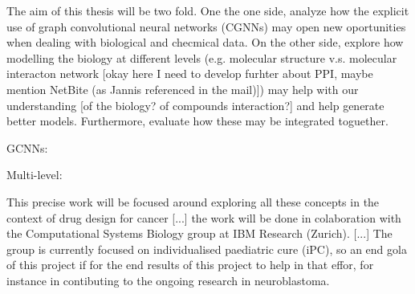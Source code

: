 \documentclass{article}
\begin{document}
The aim of this thesis will be two fold. One the one side, analyze how the explicit use
of graph convolutional neural networks (CGNNs) may open new oportunities when dealing
with biological and checmical data. On the other side, explore how modelling the biology
at different levels (e.g. molecular structure v.s. molecular interacton network [okay
here I need to develop furhter about PPI, maybe mention NetBite (as Jannis referenced in
the mail)]) may help with our understanding [of the biology? of compounds interaction?]
and help generate better models. Furthermore, evaluate how these may be integrated
toguether.

GCNNs: 

Multi-level:

This precise work will be focused around exploring all these concepts in the context of
drug design for cancer [...] the work will be done in colaboration with the
Computational Systems Biology group at IBM Research (Zurich). [...] The group is
currently focused on individualised paediatric cure (iPC), so an end gola of this
project if for the end results of this project to help in that effor, for instance in
contibuting to the ongoing research in neuroblastoma.


\end{document}
